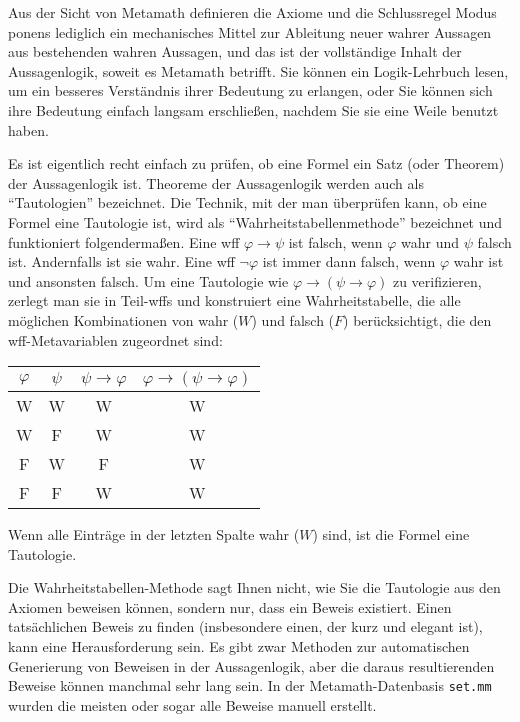 Aus der Sicht von Metamath definieren die Axiome und die Schlussregel Modus ponens lediglich ein mechanisches Mittel zur Ableitung neuer wahrer Aussagen aus bestehenden wahren Aussagen, und das ist der vollständige Inhalt der Aussagenlogik, soweit es Metamath betrifft.  Sie können ein Logik-Lehrbuch lesen, um ein besseres Verständnis ihrer Bedeutung zu erlangen, oder Sie können sich ihre Bedeutung einfach langsam erschließen, nachdem Sie sie eine Weile benutzt haben.

Es ist eigentlich recht einfach zu prüfen, ob eine Formel ein Satz (oder Theorem) der Aussagenlogik ist.  Theoreme der Aussagenlogik werden auch als "`Tautologien"' bezeichnet.  Die Technik, mit der man überprüfen kann, ob eine Formel eine Tautologie ist, wird als "`Wahrheitstabellenmethode"' bezeichnet und funktioniert folgendermaßen.  Eine wff $\varphi\rightarrow\psi$ ist falsch, wenn $\varphi$ wahr und $\psi$ falsch ist.  Andernfalls ist sie wahr.  Eine wff $\lnot\varphi$ ist immer dann falsch, wenn $\varphi$ wahr ist und ansonsten falsch. Um eine Tautologie wie $\varphi\rightarrow(\psi\rightarrow \varphi)$ zu verifizieren, zerlegt man sie in Teil-wffs und konstruiert eine Wahrheitstabelle, die alle möglichen Kombinationen von wahr ($W$) und falsch ($F$) berücksichtigt, die den wff-Metavariablen zugeordnet sind:
\begin{center}\begin{tabular}{|c|c|c|c|}\hline
\mbox{$\varphi$} & \mbox{$\psi$} & \mbox{$\psi\rightarrow\varphi$}
    & \mbox{$\varphi\rightarrow(\psi\rightarrow \varphi)$} \\ \hline \hline
              W   &  W    &      W       &        W    \\ \hline
              W   &  F    &      W       &        W    \\ \hline
              F   &  W    &      F       &        W    \\ \hline
              F   &  F    &      W       &        W    \\ \hline
\end{tabular}\end{center}
Wenn alle Einträge in der letzten Spalte wahr ($W$) sind, ist die Formel eine Tautologie.

Die Wahrheitstabellen-Methode sagt Ihnen nicht, wie Sie die Tautologie aus den Axiomen beweisen können, sondern nur, dass ein Beweis existiert.  Einen tatsächlichen Beweis zu finden (insbesondere einen, der kurz und elegant ist), kann eine Herausforderung sein.  Es gibt zwar Methoden zur automatischen Generierung von Beweisen in der Aussagenlogik, aber die daraus resultierenden Beweise können manchmal sehr lang sein.  In der Metamath-Datenbasis \texttt{set.mm} wurden die meisten oder sogar alle Beweise manuell erstellt.

